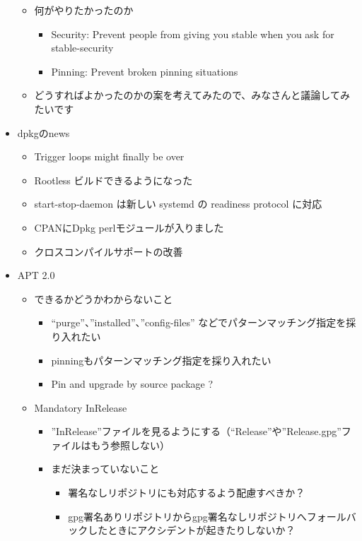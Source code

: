 \documentclass[mingoth,a4paper]{jsarticle}
\begin{document}
\begin{itemize}
\begin{itemize}
  \item 何がやりたかったのか
    \begin{itemize}
    \item Security: Prevent people from giving you stable when you ask for stable-security
    \item Pinning: Prevent broken pinning situations
     \end{itemize}
  \item どうすればよかったのかの案を考えてみたので、みなさんと議論してみたいです
  \end{itemize}
\item dpkgのnews
  \begin{itemize}
  \item Trigger loops might finally be over
  \item Rootless ビルドできるようになった
  \item start-stop-daemon は新しい systemd の readiness protocol に対応
  \item CPANにDpkg perlモジュールが入りました
  \item クロスコンパイルサポートの改善    
  \end{itemize}
\item APT 2.0
  \begin{itemize}
  \item できるかどうかわからないこと
    \begin{itemize}
    \item ``purge''、''installed''、''config-files'' などでパターンマッチング指定を採り入れたい
    \item pinningもパターンマッチング指定を採り入れたい
    \item Pin and upgrade by source package ?
    \end{itemize}
  \item Mandatory InRelease
    \begin{itemize}
    \item ''InRelease''ファイルを見るようにする（``Release''や''Release.gpg''ファイルはもう参照しない）
    \item まだ決まっていないこと
      \begin{itemize}
      \item 署名なしリポジトリにも対応するよう配慮すべきか？
      \item gpg署名ありリポジトリからgpg署名なしリポジトリへフォールバックしたときにアクシデントが起きたりしないか？
      \end{itemize}
    \end{itemize}
  \end{itemize}
\end{itemize}
\end{document}
